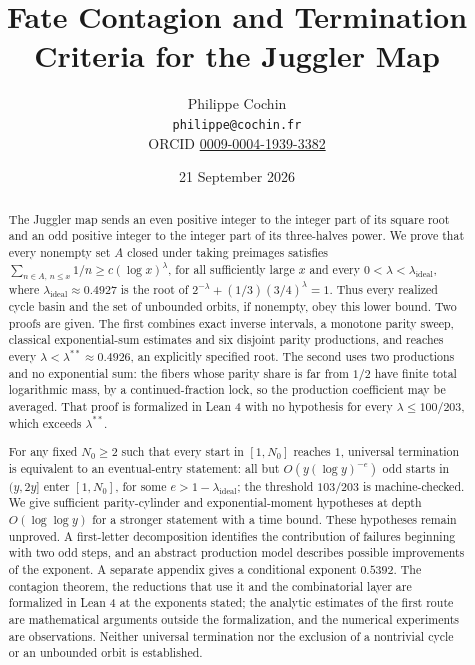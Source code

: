 \documentclass[11pt,a4paper]{article}
\title{Fate Contagion and Termination Criteria for the Juggler Map}
\author{Philippe Cochin \\ \texttt{philippe@cochin.fr} \\
  \small ORCID \href{https://orcid.org/0009-0004-1939-3382}{0009-0004-1939-3382}}
\date{21 September 2026}
\begin{document}
\maketitle
\begin{abstract}

The Juggler map sends an even positive integer to the integer part of
its square root and an odd positive integer to the integer part of its
three-halves power. We prove that every nonempty set \(A\) closed under
taking preimages satisfies
\(\sum_{n\in A,\,n\le x}1/n\ge c(\log x)^\lambda\), for all sufficiently
large \(x\) and every \(0<\lambda<\lambda_{\mathrm{ideal}}\), where
\(\lambda_{\mathrm{ideal}}\approx0.4927\) is the root of
\(2^{-\lambda}+(1/3)(3/4)^{\lambda}=1\). Thus every realized cycle basin
and the set of unbounded orbits, if nonempty, obey this lower bound. Two
proofs are given. The first combines exact inverse intervals, a monotone
parity sweep, classical exponential-sum estimates and six disjoint
parity productions, and reaches every
\(\lambda<\lambda^{**}\approx0.4926\), an explicitly specified root. The
second uses two productions and no exponential sum: the fibers whose
parity share is far from \(1/2\) have finite total logarithmic mass, by
a continued-fraction lock, so the production coefficient may be
averaged. That proof is formalized in Lean 4 with no hypothesis for
every \(\lambda\le100/203\), which exceeds \(\lambda^{**}\).

For any fixed \(N_0\ge2\) such that every start in \([1,N_0]\) reaches
\(1\), universal termination is equivalent to an eventual-entry
statement: all but \(O(y(\log y)^{-e})\) odd starts in \((y,2y]\) enter
\([1,N_0]\), for some \(e>1-\lambda_{\mathrm{ideal}}\); the threshold
\(103/203\) is machine-checked. We give sufficient parity-cylinder and
exponential-moment hypotheses at depth \(O(\log\log y)\) for a stronger
statement with a time bound. These hypotheses remain unproved. A
first-letter decomposition identifies the contribution of failures
beginning with two odd steps, and an abstract production model describes
possible improvements of the exponent. A separate appendix gives a
conditional exponent \(0.5392\). The contagion theorem, the reductions
that use it and the combinatorial layer are formalized in Lean 4 at the
exponents stated; the analytic estimates of the first route are
mathematical arguments outside the formalization, and the numerical
experiments are observations. Neither universal termination nor the
exclusion of a nontrivial cycle or an unbounded orbit is established.

\end{abstract}
\end{document}

